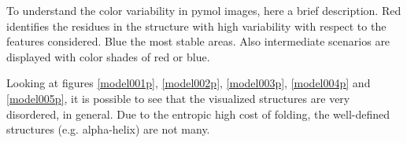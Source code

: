 \medskip
\medskip
To understand the color variability in pymol images, here a brief description. Red identifies the residues in the structure with high variability with respect to the features considered. Blue the most stable areas. Also intermediate scenarios are displayed with color shades of red or blue.  

\medskip
Looking at figures \ref{model001p}, \ref{model002p}, \ref{model003p}, \ref{model004p} and \ref{model005p}, it is possible to see that the visualized structures are very disordered, in general. Due to the entropic high cost of folding, the well-defined structures (e.g. alpha-helix) are not many. 
